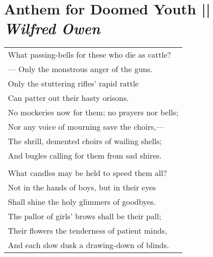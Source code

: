 \section[Anthem for Doomed Youth ]{Anthem for Doomed Youth || \emph{Wilfred Owen} \hspace*{\fill}  \thepage}
\hspace{0pt}
\vfill
\begin{center}
\begin{tabular}{l}
What passing-bells for these who die as cattle?\\
\hspace{4mm} — Only the monstrous anger of the guns.\\
\hspace{4mm} Only the stuttering rifles' rapid rattle\\
Can patter out their hasty orisons.\\
No mockeries now for them; no prayers nor bells; \\
\hspace{4mm} Nor any voice of mourning save the choirs,—\\
The shrill, demented choirs of wailing shells;\\
\hspace{4mm} And bugles calling for them from sad shires.\\
\\
What candles may be held to speed them all?\\
\hspace{4mm} Not in the hands of boys, but in their eyes\\
Shall shine the holy glimmers of goodbyes.\\
\hspace{4mm} The pallor of girls' brows shall be their pall;\\
Their flowers the tenderness of patient minds,\\
And each slow dusk a drawing-down of blinds.
\end{tabular}
\end{center}
\vfill
\hspace{0pt}